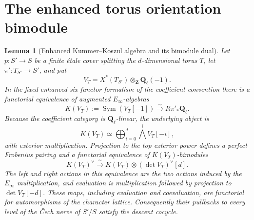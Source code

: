 \documentclass[11pt]{article}
\newtheorem{lemma}[theorem]{Lemma}
\theoremstyle{definition}
\theoremstyle{remark}
\newcommand{\Qell}{\mathbf Q_\ell}
\begin{document}
\section{The enhanced torus orientation bimodule}\label{sec:torus-orientation-bimodule}
\begin{lemma}[Enhanced Kummer--Koszul algebra and its bimodule dual]
\label{lem:enhanced-torus-Koszul}
Let $p:S'\to S$ be a finite \'etale cover splitting the $d$-dimensional torus
$T$, let $\pi':T_{S'}\to S'$, and put
\[
 V_T=X^*(T_{S'})\otimes_{\mathbf Z}\Qell(-1).
\]
In the fixed enhanced six-functor formalism of the coefficient convention
there is
a functorial equivalence of augmented $E_\infty$-algebras
\begin{equation}
 K(V_T):=\operatorname{Sym}(V_T[-1])
 \xrightarrow{\ \sim\ }R\pi'_*\Qell.
 \label{eq:enhanced-torus-Koszul-algebra}
\end{equation}
Because the coefficient category is $\Qell$-linear, the underlying object is
\begin{equation}
 K(V_T)\simeq
 \bigoplus_{i=0}^d\bigwedge^iV_T[-i],
 \label{eq:enhanced-torus-exterior-object}
\end{equation}
with exterior multiplication.  Projection to the top exterior power defines
a perfect Frobenius pairing and a functorial equivalence of
$K(V_T)$-bimodules
\begin{equation}
 K(V_T)^\vee
 \xrightarrow{\ \sim\ }
 K(V_T)\otimes(\det V_T)^\vee[d].
 \label{eq:enhanced-torus-Koszul-bimodule-dual}
\end{equation}
The left and right actions in this equivalence are the two actions induced by
the $E_\infty$ multiplication, and evaluation is multiplication followed by
projection to $\det V_T[-d]$.  These maps, including evaluation and
coevaluation, are functorial for automorphisms of the character lattice.
Consequently their pullbacks to every level of the \v{C}ech nerve of $S'/S$
satisfy the descent cocycle.
\end{lemma}
\end{document}
